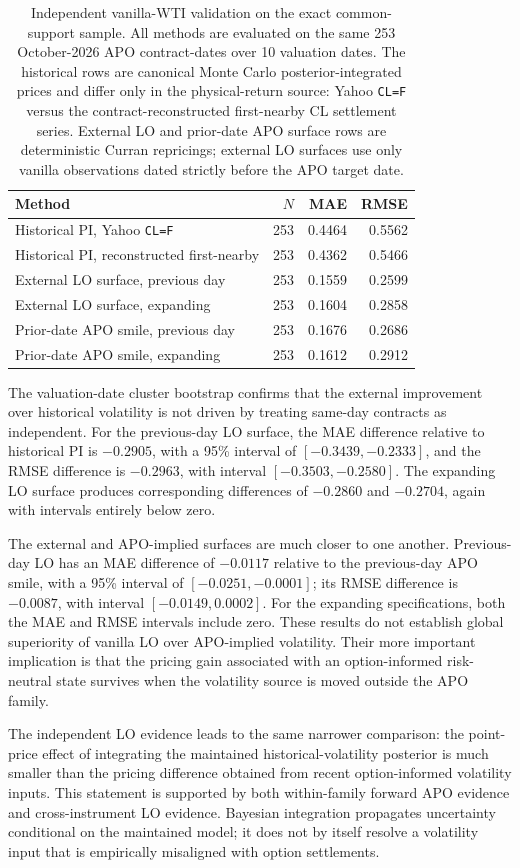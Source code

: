 \begin{table}[t]
\centering
\caption{Independent vanilla-WTI validation on the exact common-support sample. All methods are evaluated on the same 253 October-2026 APO contract-dates over 10 valuation dates. The historical rows are canonical Monte Carlo posterior-integrated prices and differ only in the physical-return source: Yahoo \texttt{CL=F} versus the contract-reconstructed first-nearby CL settlement series. External LO and prior-date APO surface rows are deterministic Curran repricings; external LO surfaces use only vanilla observations dated strictly before the APO target date.}\label{tab:external_lo}
\begin{tabular}{lrrr}
\toprule
Method & $N$ & MAE & RMSE\\
\midrule
Historical PI, Yahoo \texttt{CL=F} & 253 & 0.4464 & 0.5562\\
Historical PI, reconstructed first-nearby & 253 & 0.4362 & 0.5466\\
External LO surface, previous day & 253 & 0.1559 & 0.2599\\
External LO surface, expanding & 253 & 0.1604 & 0.2858\\
Prior-date APO smile, previous day & 253 & 0.1676 & 0.2686\\
Prior-date APO smile, expanding & 253 & 0.1612 & 0.2912\\
\bottomrule
\end{tabular}
\end{table}

The valuation-date cluster bootstrap confirms that the external improvement over historical volatility is not driven by treating same-day contracts as independent. For the previous-day LO surface, the MAE difference relative to historical PI is $-0.2905$, with a 95\% interval of $[-0.3439,-0.2333]$, and the RMSE difference is $-0.2963$, with interval $[-0.3503,-0.2580]$. The expanding LO surface produces corresponding differences of $-0.2860$ and $-0.2704$, again with intervals entirely below zero.

The external and APO-implied surfaces are much closer to one another. Previous-day LO has an MAE difference of $-0.0117$ relative to the previous-day APO smile, with a 95\% interval of $[-0.0251,-0.0001]$; its RMSE difference is $-0.0087$, with interval $[-0.0149,0.0002]$. For the expanding specifications, both the MAE and RMSE intervals include zero. These results do not establish global superiority of vanilla LO over APO-implied volatility. Their more important implication is that the pricing gain associated with an option-informed risk-neutral state survives when the volatility source is moved outside the APO family.

The independent LO evidence leads to the same narrower comparison: the point-price effect of integrating the maintained historical-volatility posterior is much smaller than the pricing difference obtained from recent option-informed volatility inputs. This statement is supported by both within-family forward APO evidence and cross-instrument LO evidence. Bayesian integration propagates uncertainty conditional on the maintained model; it does not by itself resolve a volatility input that is empirically misaligned with option settlements.

